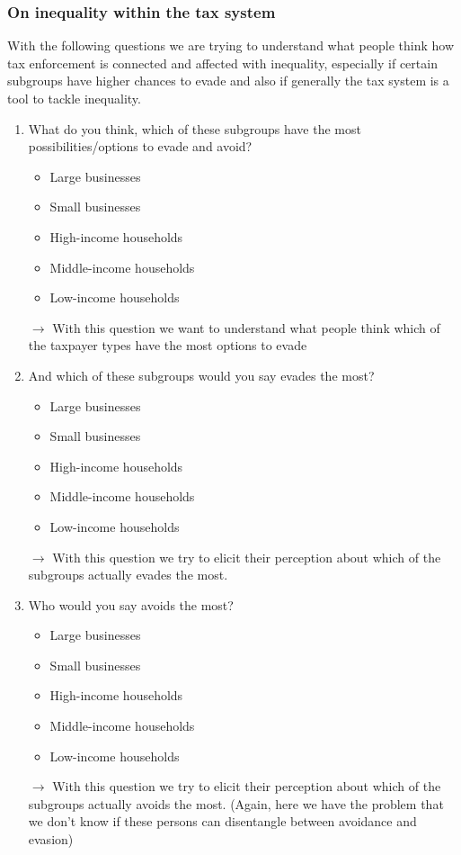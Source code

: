 \documentclass[12pt]{article}
\begin{document}
\subsubsection{On inequality within the tax system}
With the following questions we are trying to understand what people think how tax enforcement is connected and affected with inequality, especially if certain subgroups have higher chances to evade and also if generally the tax system is a tool to tackle inequality.
\begin{enumerate}
    \item What do you think, which of these subgroups have the most possibilities/options to evade and avoid?
     \begin{itemize}
        \item Large businesses
        \item Small businesses
        \item High-income households
        \item Middle-income households
        \item Low-income households
    \end{itemize} $\rightarrow$ With this question we want to understand what people think which of the taxpayer types have the most options to evade 
    \item And which of these subgroups would you say evades the most? 
    \begin{itemize}
        \item Large businesses
        \item Small businesses
        \item High-income households
        \item Middle-income households
        \item Low-income households
    \end{itemize} $\rightarrow$ With this question we try to elicit their perception about which of the subgroups actually evades the most.
    \item Who would you say avoids the most? 
    \begin{itemize}
        \item Large businesses
        \item Small businesses
        \item High-income households
        \item Middle-income households
        \item Low-income households
    \end{itemize} $\rightarrow$ With this question we try to elicit their perception about which of the subgroups actually avoids the most. (Again, here we have the problem that we don't know if these persons can disentangle between avoidance and evasion)

\end{enumerate}
\end{document}
